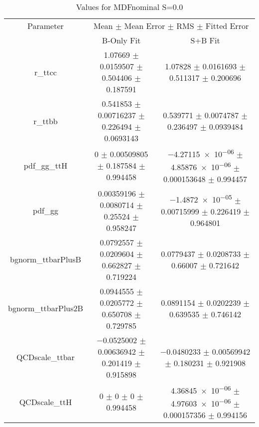\begin{table}
\centering
\caption{Values for MDFnominal S=0.0}
\begin{tabular}{ccc}
\toprule
Parameter & \multicolumn{2}{c}{Mean $\pm$ Mean Error $\pm$ RMS $\pm$ Fitted Error}\\
 & B-Only Fit & S+B Fit\\
\midrule
r\_ttcc & \num{1.07669} $\pm$ \num{0.0159507} $\pm$ \num{0.504406} $\pm$ \num{0.187591} & \num{1.07828} $\pm$ \num{0.0161693} $\pm$ \num{0.511317} $\pm$ \num{0.200696}\\
r\_ttbb & \num{0.541853} $\pm$ \num{0.00716237} $\pm$ \num{0.226494} $\pm$ \num{0.0693143} & \num{0.539771} $\pm$ \num{0.0074787} $\pm$ \num{0.236497} $\pm$ \num{0.0939484}\\
pdf\_gg\_ttH & \num{0} $\pm$ \num{0.00509805} $\pm$ \num{0.187584} $\pm$ \num{0.994458} & \num{-4.27115e-06} $\pm$ \num{4.85876e-06} $\pm$ \num{0.000153648} $\pm$ \num{0.994457}\\
pdf\_gg & \num{0.00359196} $\pm$ \num{0.0080714} $\pm$ \num{0.25524} $\pm$ \num{0.958247} & \num{-1.4872e-05} $\pm$ \num{0.00715999} $\pm$ \num{0.226419} $\pm$ \num{0.964801}\\
bgnorm\_ttbarPlusB & \num{0.0792557} $\pm$ \num{0.0209604} $\pm$ \num{0.662827} $\pm$ \num{0.719224} & \num{0.0779437} $\pm$ \num{0.0208733} $\pm$ \num{0.66007} $\pm$ \num{0.721642}\\
bgnorm\_ttbarPlus2B & \num{0.0944555} $\pm$ \num{0.0205772} $\pm$ \num{0.650708} $\pm$ \num{0.729785} & \num{0.0891154} $\pm$ \num{0.0202239} $\pm$ \num{0.639535} $\pm$ \num{0.746142}\\
QCDscale\_ttbar & \num{-0.0525002} $\pm$ \num{0.00636942} $\pm$ \num{0.201419} $\pm$ \num{0.915898} & \num{-0.0480233} $\pm$ \num{0.00569942} $\pm$ \num{0.180231} $\pm$ \num{0.921908}\\
QCDscale\_ttH & \num{0} $\pm$ \num{0} $\pm$ \num{0} $\pm$ \num{0.994458} & \num{4.36845e-06} $\pm$ \num{4.97603e-06} $\pm$ \num{0.000157356} $\pm$ \num{0.994156}\\
\bottomrule
\end{tabular}
\end{table}